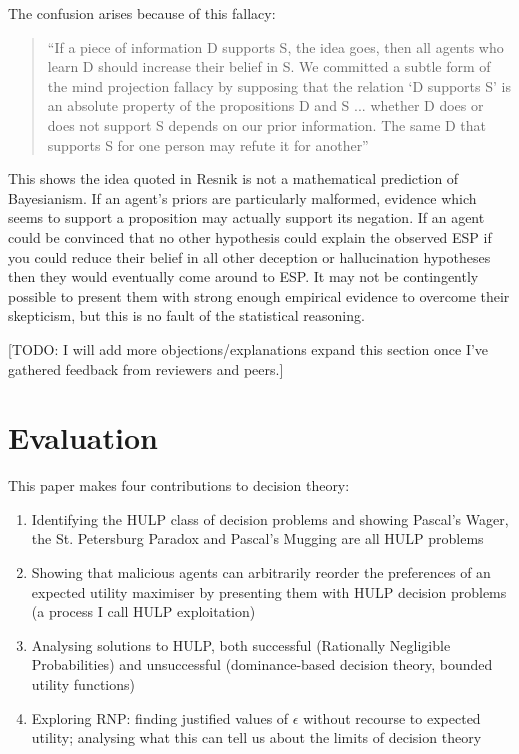 \documentclass{article}
\begin{document}
The confusion arises because of this fallacy: 

\begin{quote}
``If a piece of information D supports S, the idea goes, then all agents who learn D should increase their belief in S. We committed a subtle form of the mind projection fallacy by supposing that the relation ‘D supports S’ is an absolute property of the propositions D and S ... whether D does or does not support S depends on our prior information. The same D that supports S for one person may refute it for another'' \citep[pg. 131]{jaynes2003probability}
\end{quote}

This shows the idea quoted in Resnik is not a mathematical prediction of Bayesianism. If an agent's priors are particularly malformed, evidence which seems to support a proposition may actually support its negation. If an agent could be convinced that no other hypothesis could explain the observed ESP \textemdash{} if you could reduce their belief in all other deception or hallucination hypotheses \textemdash{} then they would eventually come around to ESP. It may not be contingently possible to present them with strong enough empirical evidence to overcome their skepticism, but this is no fault of the statistical reasoning.

[TODO: I will add more objections/explanations expand this section once I've gathered feedback from reviewers and peers.]

\section{Evaluation}
This paper makes four contributions to decision theory:

\begin{enumerate}
\item Identifying the HULP class of decision problems and showing Pascal's Wager, the St. Petersburg Paradox and Pascal's Mugging are all HULP problems
\item Showing that malicious agents can arbitrarily reorder the preferences of an expected utility maximiser by presenting them with HULP decision problems (a process I call HULP exploitation)
\item Analysing solutions to HULP, both successful (Rationally Negligible Probabilities) and unsuccessful (dominance-based decision theory, bounded utility functions)
\item Exploring RNP: finding justified values of \(\epsilon\) without recourse to expected utility; analysing what this can tell us about the limits of decision theory
\end{enumerate}
\end{document}
